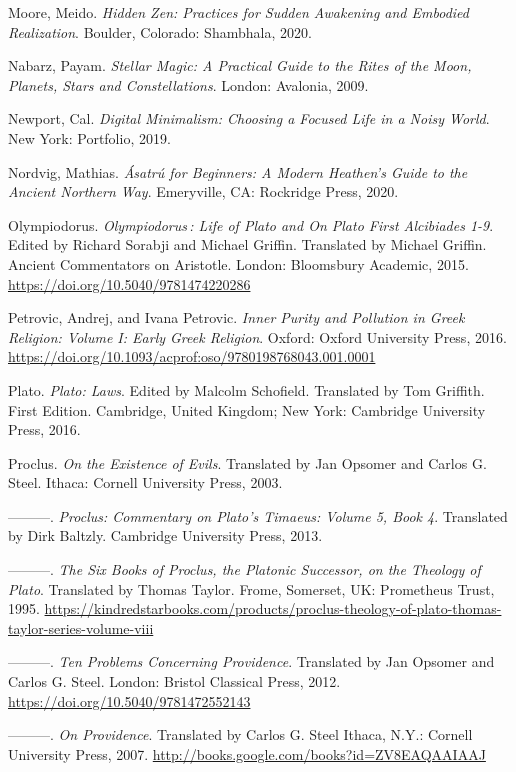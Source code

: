 \documentclass[
]{book}
\begin{document}
Moore, Meido. \emph{Hidden Zen: Practices for Sudden Awakening and Embodied Realization}. Boulder, Colorado: Shambhala, 2020.

Nabarz, Payam. \emph{Stellar Magic: A Practical Guide to the Rites of the Moon, Planets, Stars and Constellations}. London: Avalonia, 2009.

Newport, Cal. \emph{Digital Minimalism: Choosing a Focused Life in a Noisy World}. New York: Portfolio, 2019.

Nordvig, Mathias. \emph{Ásatrú for Beginners: A Modern Heathen's Guide to the Ancient Northern Way}. Emeryville, CA: Rockridge Press, 2020.

Olympiodorus. \emph{Olympiodorus\,: Life of Plato and On Plato First Alcibiades 1-9}. Edited by Richard Sorabji and Michael Griffin. Translated by Michael Griffin. Ancient Commentators on Aristotle. London: Bloomsbury Academic, 2015. \url{https://doi.org/10.5040/9781474220286}

Petrovic, Andrej, and Ivana Petrovic. \emph{Inner Purity and Pollution in Greek Religion: Volume I: Early Greek Religion}. Oxford: Oxford University Press, 2016. \href{https://doi.org/10.5040/9781474220286}{https://doi.org/10.1093/acprof:oso/9780198768043.001.0001}

Plato. \emph{Plato: Laws}. Edited by Malcolm Schofield. Translated by Tom Griffith. First Edition. Cambridge, United Kingdom; New York: Cambridge University Press, 2016.

Proclus. \emph{On the Existence of Evils}. Translated by Jan Opsomer and Carlos G. Steel. Ithaca: Cornell University Press, 2003.

---------. \emph{Proclus: Commentary on Plato's Timaeus: Volume 5, Book 4}. Translated by Dirk Baltzly. Cambridge University Press, 2013.

---------. \emph{The Six Books of Proclus, the Platonic Successor, on the Theology of Plato}. Translated by Thomas Taylor. Frome, Somerset, UK: Prometheus Trust, 1995. \url{https://kindredstarbooks.com/products/proclus-theology-of-plato-thomas-taylor-series-volume-viii}

---------. \emph{Ten Problems Concerning Providence}. Translated by Jan Opsomer and Carlos G. Steel. London: Bristol Classical Press, 2012. \url{https://doi.org/10.5040/9781472552143}

---------. \emph{On Providence}. Translated by Carlos G. Steel Ithaca, N.Y.: Cornell University Press, 2007. \url{http://books.google.com/books?id=ZV8EAQAAIAAJ}
\end{document}
